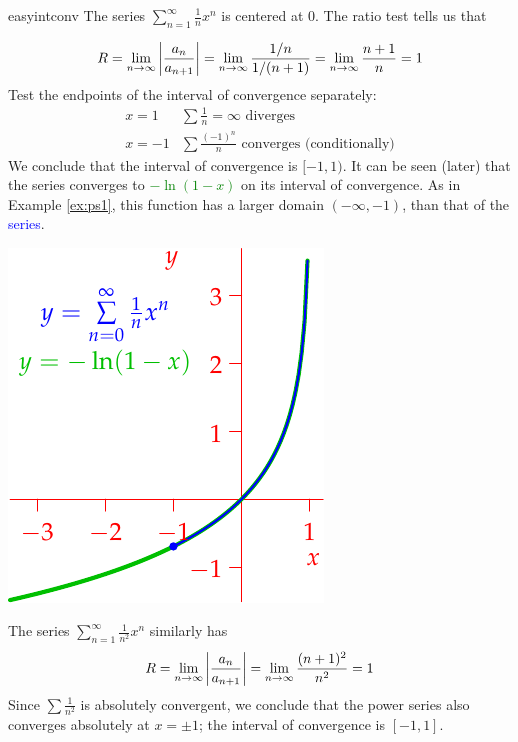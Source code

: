 \begin{examples}{}{easyintconv}
	\exstart The series $\sum_{n=1}^\infty \frac 1nx^n$ is centered at $0$. The ratio test tells us that
	\begin{enumerate}\setcounter{enumi}{1}
	  \begin{minipage}[t]{0.65\linewidth}\vspace{-15pt}
	  \item[]
	  \[
	  	R=\lim_{n\to\infty}\left| \frac{a_n}{a_{n+1}}\right|
	  	=\lim_{n\to\infty}\frac{1/n}{1/(n+1)} 
	  	=\lim_{n\to\infty}\frac{n+1}{n}=1
	  \]
	  Test the endpoints of the interval of convergence separately:
	  \[
	  	\begin{array}{ll}
	  		x=1&\sum \frac 1n=\infty\text{ diverges}\\[5pt]
	  		x=-1&\sum \frac{(-1)^n}n\text{ converges (conditionally)}
	  	\end{array}
	  \]
	  We conclude that the interval of convergence is $[-1,1)$.\medbreak
	  It can be seen (later) that the series converges to \textcolor{Green}{$-\ln(1-x)$} on its interval of convergence. As in Example \ref{ex:ps1}, this function has a larger domain $(-\infty,-1)$, than that of the \textcolor{blue}{series}.
		\end{minipage}
		\hfill
		\begin{minipage}[t]{0.34\linewidth}\vspace{0pt}
			\flushright\includegraphics[scale=0.95]{powerseriesex2}
		\end{minipage}
		
		
	  \item The series $\sum_{n=1}^\infty\frac 1{n^2}x^n$ similarly has
	  \[
	  	R=\lim_{n\to\infty}\left| \frac{a_n}{a_{n+1}}\right|
	  	=\lim_{n\to\infty}\frac{(n+1)^2}{n^2}=1
	  \]
		Since $\sum \frac 1{n^2}$ is absolutely convergent, we conclude that the power series also converges absolutely at $x=\pm 
		1$; the interval of convergence is $[-1,1]$.
	

\end{enumerate}
\end{examples}
